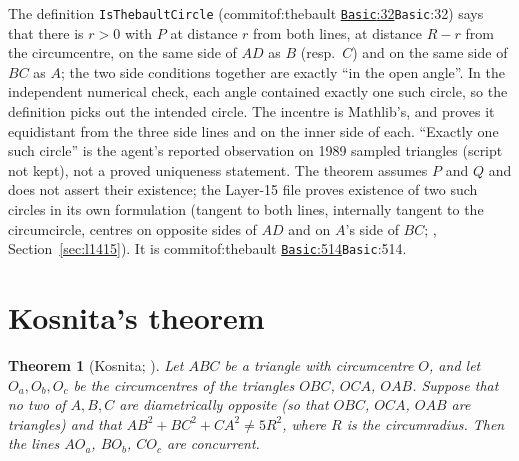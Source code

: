 \documentclass[11pt]{article}
\newtheorem{theorem}{Theorem}
\theoremstyle{definition}
\theoremstyle{remark}
\newcommand{\lean}[1]{\texttt{#1}}
\newcommand{\commitof}[1]{\csname commitof:#1\endcsname}
\newcommand{\repo}[1]{https://github.com/jpbald93/#1}
\newcommand{\src}[4]{\ifcsname commitof:#1\endcsname
  \href{\repo{#1}/blob/\commitof{#1}/#2/#3.lean\#L#4}{\texttt{#3}:#4}\else\texttt{#3}:#4\fi}
\begin{document}
The definition \lean{IsThebaultCircle} (\src{thebault}{Thebault3}{Basic}{32}) says that there is
$r>0$ with $P$ at distance $r$ from both lines, at distance $R-r$ from the circumcentre, on the same
side of $AD$ as $B$ (resp.\ $C$) and on the same side of $BC$ as $A$; the two side conditions
together are exactly ``in the open angle''. In the independent numerical check, each angle
contained exactly one such circle, so the definition picks out the intended circle. The incentre is Mathlib's, and
 proves it equidistant from the three side lines and on the inner
side of each. ``Exactly one such circle'' is the agent's reported observation on 1989 sampled triangles (script not kept), not a proved
uniqueness statement. The theorem assumes $P$ and $Q$ and does not assert their existence; the
Layer-15 file proves existence of two such circles in its own formulation (tangent to both lines,
internally tangent to the circumcircle, centres on opposite sides of $AD$ and on $A$'s side of $BC$;
, Section~\ref{sec:l1415}). It is
\src{thebault}{Thebault3}{Basic}{514}.

\section{Kosnita's theorem}\label{sec:kosnita}

\begin{theorem}[Kosnita; ]\label{thm:kosnita}
Let $ABC$ be a triangle with circumcentre $O$, and let $O_a,O_b,O_c$ be the circumcentres of the
triangles $OBC$, $OCA$, $OAB$. Suppose that no two of $A,B,C$ are diametrically opposite (so that
$OBC$, $OCA$, $OAB$ are triangles) and that $AB^2+BC^2+CA^2\neq 5R^2$, where $R$ is the circumradius.
Then the lines $AO_a$, $BO_b$, $CO_c$ are concurrent.
\end{theorem}
\end{document}
